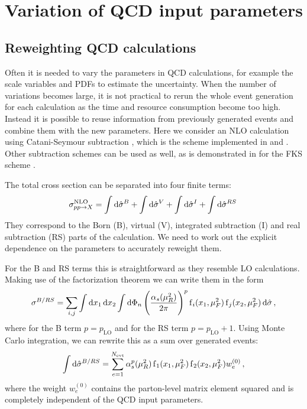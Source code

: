 
\chapter{Variation of QCD input parameters}
%
\section{Reweighting QCD calculations}
Often it is needed to vary the parameters in QCD calculations, for example the scale variables and PDFs to estimate the uncertainty.
When the number of variations becomes large, it is not practical to rerun the whole event generation for each calculation as the time and resource consumption become too high.
Instead it is possible to reuse information from previously generated events and combine them with the new parameters.
Here we consider an NLO calculation using Catani-Seymour subtraction \cite{catani_seymour1997}, which is the scheme implemented in \sherpa{} and \mcgrid{}.
Other subtraction schemes can be used as well, as is demonstrated in \cite{amcfast} for the FKS scheme \cite{fks_a,fks_b}.

The total cross section can be separated into four finite terms:
%
\begin{equation}
	\sigma^\text{NLO}_{pp \rightarrow X} = \int \dif \hat \sigma^B + \int \dif \hat \sigma^V + \int \dif \hat \sigma^I + \int \dif \hat \sigma^{RS} \,
\end{equation}
%
They correspond to the Born (B), virtual (V), integrated subtraction (I) and real subtraction (RS) parts of the calculation.
We need to work out the explicit dependence on the parameters to accurately reweight them.

For the B and RS terms this is straightforward as they resemble LO calculations.
Making use of the factorization theorem we can write them in the form
%
\begin{equation}
	\sigma^{B/RS} = \sum_{i,j} \int \dif x_1 \dif x_2 \int \dif \Phi_n \left( \frac{\alpha_s(\mu_R^2)}{2 \pi} \right)^p \pdf_i(x_1,\mu_F^2) \pdf_j(x_2,\mu_F^2) \dif \hat\sigma \, ,
\end{equation}
%
where for the B term $p = p_\text{LO}$ and for the RS term $p = p_\text{LO} + 1$.
Using Monte Carlo integration, we can rewrite this as a sum over generated events:
%
\begin{equation}
  \int \dif \hat \sigma^{B/RS} = \sum_{e=1}^{N_\text{evt}} \alpha_s^p(\mu_R^2) \pdf_1(x_1,\mu_F^2) \pdf_2(x_2,\mu_F^2) w_e^{(0)} \, ,
  \label{eq:reweight_lo}
\end{equation}
%
where the weight $w_e^{(0)}$ contains the parton-level matrix element squared and is completely independent of the QCD input parameters.

